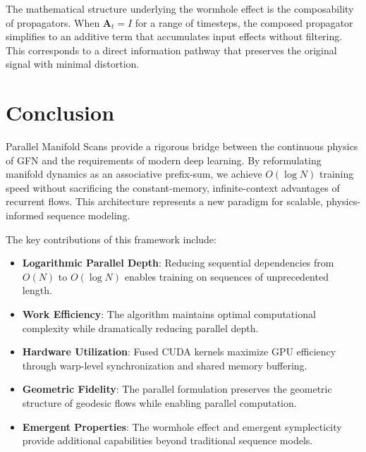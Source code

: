 \documentclass[12pt,a4paper]{article}
\newcommand{\bA}{\mathbf{A}}
\begin{document}
The mathematical structure underlying the wormhole effect is the composability of propagators. When $\bA_t = I$ for a range of timesteps, the composed propagator simplifies to an additive term that accumulates input effects without filtering. This corresponds to a direct information pathway that preserves the original signal with minimal distortion.

\section{Conclusion}

Parallel Manifold Scans provide a rigorous bridge between the continuous physics of GFN and the requirements of modern deep learning. By reformulating manifold dynamics as an associative prefix-sum, we achieve $O(\log N)$ training speed without sacrificing the constant-memory, infinite-context advantages of recurrent flows. This architecture represents a new paradigm for scalable, physics-informed sequence modeling.

The key contributions of this framework include:

\begin{itemize}[leftmargin=1cm]
\item \textbf{Logarithmic Parallel Depth}: Reducing sequential dependencies from $O(N)$ to $O(\log N)$ enables training on sequences of unprecedented length.

\item \textbf{Work Efficiency}: The algorithm maintains optimal computational complexity while dramatically reducing parallel depth.

\item \textbf{Hardware Utilization}: Fused CUDA kernels maximize GPU efficiency through warp-level synchronization and shared memory buffering.

\item \textbf{Geometric Fidelity}: The parallel formulation preserves the geometric structure of geodesic flows while enabling parallel computation.

\item \textbf{Emergent Properties}: The wormhole effect and emergent symplecticity provide additional capabilities beyond traditional sequence models.
\end{itemize}
\end{document}
